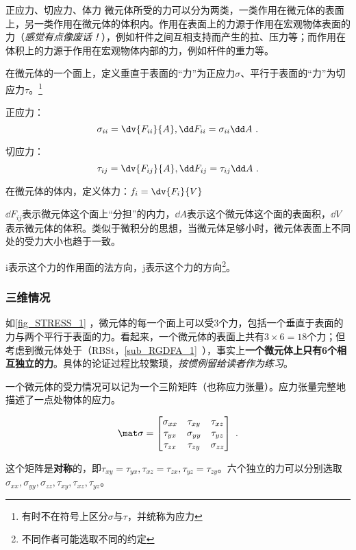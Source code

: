 \begin{definition}{正应力、切应力、体力}
微元体所受的力可以分为两类，一类作用在微元体的表面上，另一类作用在微元体的体积内。作用在表面上的力源于作用在宏观物体表面的力（\textsl{感觉有点像废话！}），例如杆件之间互相支持而产生的拉、压力等；而作用在体积上的力源于作用在宏观物体内部的力，例如杆件的重力等。

在微元体的一个面上，定义垂直于表面的“力”为正应力$\sigma$、平行于表面的“力”为切应力$\tau$。\footnote{有时不在符号上区分$\sigma$与$\tau$，并统称为应力}

正应力：$$\sigma_{ii} =\dv{F_{ii}}{A}, \dd F_{ii} = \sigma_{ii} \dd A~.$$

切应力：$$\tau_{ij}=\dv{F_{ij}}{A}, \dd F_{ij} = \tau_{ij} \dd A~.$$

在微元体的体内，定义体力：$f_i = \dv{F_i}{V}$

$\dd F_{ij}$表示微元体这个面上“分担”的内力，$\dd A$表示这个微元体这个面的表面积，$\dd V$表示微元体的体积。类似于微积分的思想，当微元体足够小时，微元体表面上不同处的受力大小也趋于一致。

i表示这个力的作用面的法方向，j表示这个力的方向\footnote{不同作者可能选取不同的约定}。
\end{definition}

\subsubsection{三维情况}
如\autoref{fig_STRESS_1} ，微元体的每一个面上可以受$3$个力，包括一个垂直于表面的力与两个平行于表面的力。看起来，一个微元体的表面上共有$3\times6=18$个力；但考虑到微元体处于（{RBSt}，\autoref{sub_RGDFA_1}~），事实上\textbf{一个微元体上只有6个相互独立的力}。具体的论证过程比较繁琐，\textsl{按惯例留给读者作为练习}。

一个微元体的受力情况可以记为一个三阶矩阵（也称应力张量）。应力张量完整地描述了一点处物体的应力。

\begin{equation}
\mat \sigma=
\begin{bmatrix}
\sigma_{xx} & \tau_{xy} & \tau_{xz} \\
\tau_{yx} & \sigma_{yy} & \tau_{yz} \\
\tau_{zx} & \tau_{zy} & \sigma_{zz} \\
\end{bmatrix}~.
\end{equation}

这个矩阵是\textbf{对称}的，即$\tau_{xy} = \tau_{yx}, \tau_{xz}=\tau_{zx}, \tau_{yz}=\tau_{zy}$。六个独立的力可以分别选取 $\sigma_{xx}, \sigma_{yy},\sigma_{zz}, \tau_{xy}, \tau_{xz},  \tau_{yz}$。

